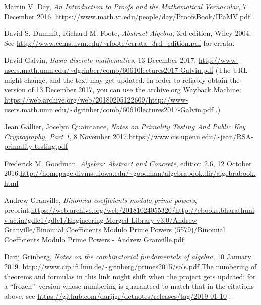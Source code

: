\documentclass[numbers=enddot,12pt,final,onecolumn,notitlepage]{scrartcl}%
\numberwithin{exer}{subsection}
\theoremstyle{definition}
\begin{document}
\begin{thebibliography}{999999999}
Martin V. Day, \textit{An Introduction to Proofs and the
Mathematical Vernacular}, 7 December 2016.\newline%
\url{https://www.math.vt.edu/people/day/ProofsBook/IPaMV.pdf} .

David S. Dummit, Richard M. Foote,
\textit{Abstract Algebra}, 3rd edition, Wiley 2004. \newline See
\url{http://www.cems.uvm.edu/~rfoote/errata_3rd_edition.pdf} for errata.

David Galvin, \textit{Basic discrete mathematics},
13 December 2017.\newline%
\url{http://www-users.math.umn.edu/~dgrinber/comb/60610lectures2017-Galvin.pdf}
\newline(The URL might change, and the text may get updated. In order to
reliably obtain the version of 13 December 2017, you can use the archive.org
Wayback Machine:
\url{https://web.archive.org/web/20180205122609/http://www-users.math.umn.edu/~dgrinber/comb/60610lectures2017-Galvin.pdf}
.)

Jean Gallier, Jocelyn Quaintance, \textit{Notes
on Primality Testing And Public Key Cryptography, Part 1}, 8 November
2017.\newline\url{https://www.cis.upenn.edu/~jean/RSA-primality-testing.pdf}

Frederick M. Goodman, \textit{Algebra: Abstract and
Concrete}, edition 2.6, 12 October 2016.\newline\url{http://homepage.divms.uiowa.edu/~goodman/algebrabook.dir/algebrabook.html}

Andrew Granville, \textit{Binomial coefficients
modulo prime powers}, preprint.\newline\url{https://web.archive.org/web/20181024055320/http://ebooks.bharathuniv.ac.in/gdlc1/gdlc1/Engineering Merged Library v3.0/Andrew Granville/Binomial Coefficients Modulo Prime Powers (5579)/Binomial Coefficients Modulo Prime Powers - Andrew Granville.pdf}

Darij Grinberg, \textit{Notes on the combinatorial
fundamentals of algebra}, 10 January 2019.\newline%
\url{http://www.cip.ifi.lmu.de/~grinberg/primes2015/sols.pdf} \newline The
numbering of theorems and formulas in this link might shift when the project
gets updated; for a \textquotedblleft frozen\textquotedblright\ version whose
numbering is guaranteed to match that in the citations above, see
\url{https://github.com/darijgr/detnotes/releases/tag/2019-01-10} .


\end{thebibliography}
\end{document}
